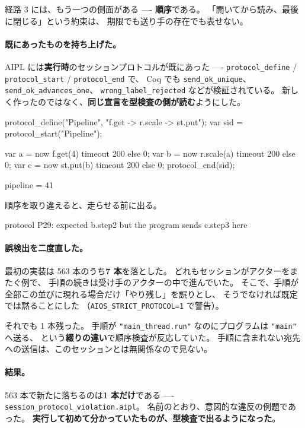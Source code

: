 \documentclass[11pt,a4paper]{ltjsarticle}
\theoremstyle{definition}
\theoremstyle{remark}
\begin{document}
経路 3 には、もう一つの側面がある ---- \textbf{順序}である。
「開いてから読み、最後に閉じる」という約束は、
期限でも送り手の存在でも表せない。

\paragraph{既にあったものを持ち上げた。}
AIPL には\textbf{実行時}のセッションプロトコルが既にあった ----
\texttt{protocol\_define} / \texttt{protocol\_start} / \texttt{protocol\_end} で、
Coq でも \texttt{send\_ok\_unique}、\texttt{send\_ok\_advances\_one}、
\texttt{wrong\_label\_rejected} などが検証されている。
新しく作ったのではなく、\textbf{同じ宣言を型検査の側が読む}ようにした。

\begin{aipl}
protocol_define("Pipeline", "f.get -> r.scale -> st.put");
var sid = protocol_start("Pipeline");

var a = now f.get(4)    timeout 200 else 0;
var b = now r.scale(a)  timeout 200 else 0;
var c = now st.put(b)   timeout 200 else 0;
protocol_end(sid);
\end{aipl}
\begin{term}
pipeline = 41
\end{term}

順序を取り違えると、走らせる前に出る。

\begin{term}
 protocol P29: expected b.step2 but the program sends c.step3 here
\end{term}

\paragraph{誤検出を二度直した。}
最初の実装は 563 本のうち\textbf{7 本}を落とした。
どれもセッションがアクターをまたぐ例で、
手順の続きは受け手のアクターの中で進んでいた。
そこで、手順が全部この並びに現れる場合だけ「やり残し」を誤りとし、
そうでなければ既定では黙ることにした
（\texttt{AIOS\_STRICT\_PROTOCOL=1} で警告）。

それでも 1 本残った。
手順が \texttt{"main\_thread.run"} なのにプログラムは \texttt{"main"} へ送る、
という\textbf{綴りの違い}で順序検査が反応していた。
手順に含まれない宛先への送信は、このセッションとは無関係なので見ない。

\paragraph{結果。}
563 本で新たに落ちるのは\textbf{1 本だけ}である ----
\texttt{session\_protocol\_violation.aipl}。
名前のとおり、意図的な違反の例題であった。
\textbf{実行して初めて分かっていたものが、型検査で出るようになった}。
\end{document}
